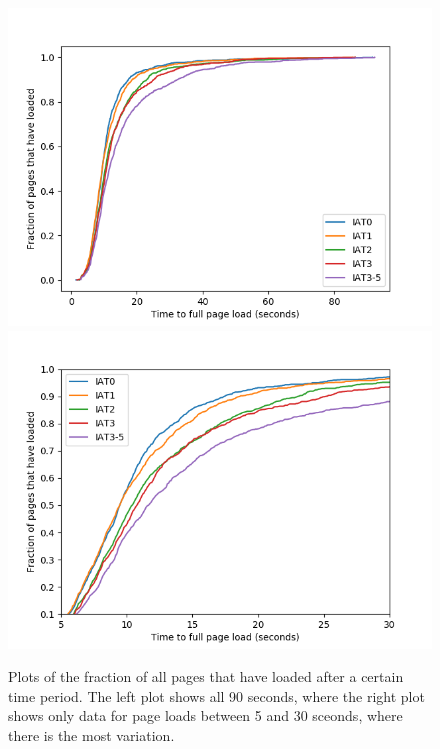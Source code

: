\documentclass[11pt]{article}
\begin{document}
\begin{figure}[h]
    \centering
    \includegraphics[scale=.45]{bw-allpages}
    \includegraphics[scale=.45]{bw-allpages-trunc}
    \caption[]{Plots of the fraction of all pages that have loaded after a certain time period. The left plot shows all 90 seconds, where the right plot shows only data for page loads between 5 and 30 sceonds, where there is the most variation.}
\end{figure}
\end{document}
